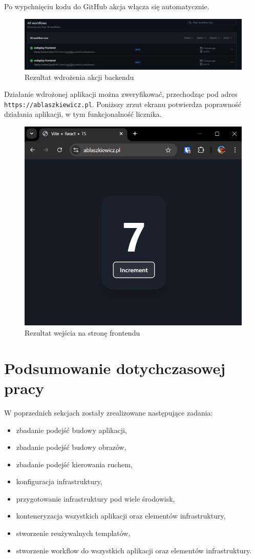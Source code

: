 \documentclass{article}
\begin{document}
Po wypchnięciu kodu do GitHub akcja włącza się automatycznie.

\begin{figure}[H]
    \centering
    \includegraphics[width=1\linewidth]{rezultatPierwszejAkcjiFrontend.png}
    \caption{Rezultat wdrożenia akcji backendu}
    \label{fig:enter-label}
\end{figure}

Działanie wdrożonej aplikacji można zweryfikować, przechodząc pod adres \lstinline|https://ablaszkiewicz.pl|. Poniższy zrzut ekranu potwierdza poprawność działania aplikacji, w tym funkcjonalność licznika.

\begin{figure}[H]
    \centering
    \includegraphics[width=0.5\linewidth]{rezultatWejsciaNaFrontend.png}
    \caption{Rezultat wejścia na stronę frontendu}
    \label{fig:enter-label}
\end{figure}

\section{Podsumowanie dotychczasowej pracy}

W poprzednich sekcjach zostały zrealizowane następujące zadania:

\begin{itemize}
    \item zbadanie podejść budowy aplikacji,
    \item zbadanie podejść budowy obrazów,
    \item zbadanie podejść kierowania ruchem,
    \item konfiguracja infrastruktury,
    \item przygotowanie infrastruktury pod wiele środowisk,
    \item konteneryzacja wszystkich aplikacji oraz elementów infrastruktury,
    \item stworzenie reużywalnych templatów,
    \item stworzenie workflow do wszystkich aplikacji oraz elementów infrastruktury.
\end{itemize}
\end{document}
